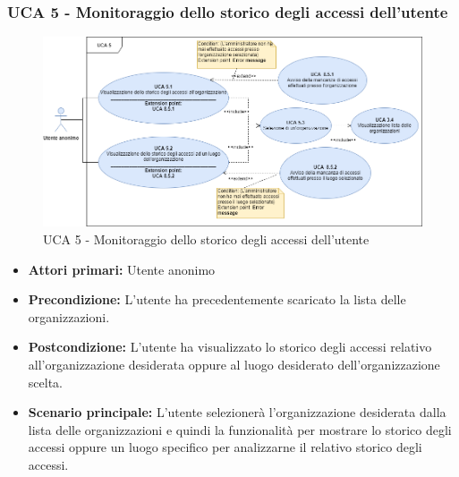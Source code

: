 \subsubsection{UCA 5 - Monitoraggio dello storico degli accessi dell'utente}

\begin{figure}[h]
	\centering	
	\includegraphics[scale=0.4, center]{Sezioni/UseCase/Immagini/UCA5.png}
	\caption{UCA 5 - Monitoraggio dello storico degli accessi dell'utente}
\end{figure}

\begin{itemize}
    \item \textbf{Attori primari:} Utente anonimo
    \item \textbf{Precondizione:} L'utente ha precedentemente scaricato la lista delle organizzazioni.
    \item \textbf{Postcondizione:} L'utente ha visualizzato lo storico degli accessi relativo all'organizzazione desiderata oppure al luogo desiderato dell'organizzazione scelta.
    \item \textbf{Scenario principale:} L'utente selezionerà l'organizzazione desiderata dalla lista delle organizzazioni e quindi la funzionalità per mostrare lo storico degli accessi oppure un luogo specifico per analizzarne il relativo storico degli accessi.
\end{itemize}


